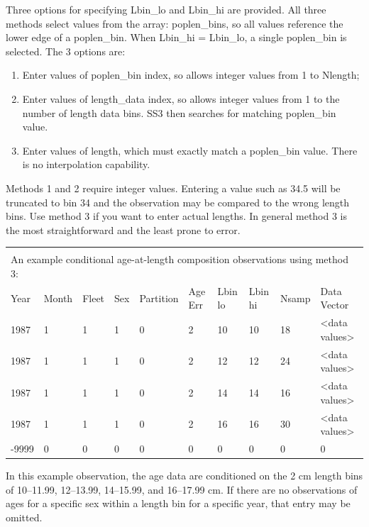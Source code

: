 Three options for specifying Lbin\_lo and Lbin\_hi are provided. All three methods select values from the array: poplen\_bins, so all values reference the lower edge of a poplen\_bin. When Lbin\_hi = Lbin\_lo, a single poplen\_bin is selected. The 3 options are:

\begin{enumerate}
	\item Enter values of poplen\_bin index, so allows integer values from 1 to Nlength;
	\item Enter values of length\_data index, so allows integer values from 1 to the number of length data bins. SS3 then searches for matching poplen\_bin value.
	\item Enter values of length, which must exactly match a poplen\_bin value. There is no interpolation capability.
\end{enumerate}

Methods 1 and 2 require integer values. Entering a value such as 34.5 will be truncated to bin 34 and the observation may be compared to the wrong length bins. Use method 3 if you want to enter actual lengths. In general method 3 is the most straightforward and the least prone to error.

\vspace*{-\baselineskip}
\begin{tabular}{p{1cm} p{1cm} p{1cm} p{1cm} p{1.5cm} p{1cm} p{1cm} p{1cm} p{1cm} p{2.5cm}}
	\multicolumn{10}{l}{} \\
	\multicolumn{10}{l}{An example conditional age-at-length composition observations using method 3:} \\
	\hline
	Year & Month & Fleet & Sex & Partition & Age Err & Lbin lo & Lbin hi & Nsamp & Data Vector \Tstrut\\
	\hline
	1987 & 1 & 1 & 1 & 0 & 2 & 10 & 10 & 18 & <data values> \Tstrut\\
	1987 & 1 & 1 & 1 & 0 & 2 & 12 & 12 & 24 & <data values> \Tstrut\\
	1987 & 1 & 1 & 1 & 0 & 2 & 14 & 14 & 16 & <data values> \Tstrut\\
	1987 & 1 & 1 & 1 & 0 & 2 & 16 & 16 & 30 & <data values> \Tstrut\\
	-9999 & 0 & 0 & 0 & 0 & 0 & 0 & 0 & 0 & 0 \Bstrut\\
	\hline
\end{tabular}

In this example observation, the age data are conditioned on the 2 cm length bins of 10--11.99, 12--13.99, 14--15.99, and 16--17.99 cm. If there are no observations of ages for a specific sex within a length bin for a specific year, that entry may be omitted.


